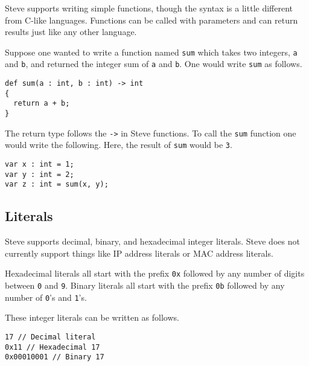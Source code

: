 Steve supports writing simple functions, though the syntax is a little different
from C-like languages. Functions can be called with parameters and can return
results just like any other language.

Suppose one wanted to write a function named \texttt{sum} which takes two
integers, \texttt{a} and \texttt{b}, and returned the integer sum of \texttt{a}
and \texttt{b}. One would write \texttt{sum} as follows.

\begin{codepage}
\begin{lstlisting}
def sum(a : int, b : int) -> int
{
  return a + b;
}
\end{lstlisting}
\end{codepage}

The return type follows the \texttt{->} in Steve functions. To call
the \texttt{sum} function one would write the following. Here, the result of
\texttt{sum} would be \texttt{3}.

\begin{codepage}
\begin{lstlisting}
var x : int = 1;
var y : int = 2;
var z : int = sum(x, y);
\end{lstlisting}
\end{codepage}

\subsection{Literals} \label{tut:literal}


Steve supports decimal, binary, and hexadecimal integer literals. Steve does not
currently support things like IP address literals or MAC address literals.

Hexadecimal literals all start with the prefix \texttt{0x} followed by any
number of digits between \texttt{0} and \texttt{9}. Binary literals all start with the prefix \texttt{0b} followed by any number of
\texttt{0}'s and \texttt{1}'s.

These integer literals can be written as follows.

\begin{codepage}
\begin{lstlisting}
17 // Decimal literal
0x11 // Hexadecimal 17
0x00010001 // Binary 17
\end{lstlisting}
\end{codepage}
 

